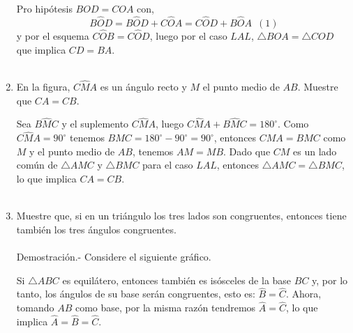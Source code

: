 \documentclass[10pt]{article}
\begin{document}
\begin{enumerate}
	Pro hipótesis $BOD=COA$ con, $$B\widehat{O}D = B\widehat{O}D + C\widehat{O}A = C\widehat{O}D + B\widehat{O}A \,\,\, (1)$$
	y por el esquema $C\widehat{O}B = C\widehat{O}D$, luego por el caso $LAL$, $\triangle BOA = \triangle COD$ que implica $CD = BA$.\\\\

	\item En la figura, $C\widehat{M}A$ es un ángulo recto y $M$ el punto medio de $AB$. Muestre que $CA=CB$.

	\begin{center}
	\end{center}

	Sea $B\widehat{M}C$ y el suplemento $C\widehat{M}A$, luego $C\widehat{M}A + B\widehat{M}C = 180^{\circ}$. Como $C\widehat{M}A = 90^{\circ}$ tenemos $B\widehat{M}C = 180^{\circ} - 90^{\circ} = 90^{\circ}$, entonces $CMA = BMC$ como $M$ y el punto medio de $AB$, tenemos $AM = MB$. Dado que $CM$ es un lado común de $\triangle AMC$ y $\triangle BMC$ para el caso $LAL$, entonces $\triangle AMC = \triangle BMC$, lo que implica $CA = CB$.\\\\
	
	\item Muestre que, si en un triángulo los tres lados son congruentes, entonces tiene también los tres ángulos congruentes.\\\\
	Demostración.-\; Considere el siguiente gráfico.

	\begin{center}
	\end{center}

	Si $\triangle ABC$ es equilátero, entonces también es isósceles de la base $BC$ y, por lo tanto, los ángulos de su base serán congruentes, esto es: $\widehat{B} = \widehat{C}$. Ahora, tomando $AB$ como base, por la misma razón tendremos $\widehat{A} = \widehat{C}$, lo que implica $\widehat{A} = \widehat{B} = \widehat{C}$.\\\\


\end{enumerate}
\end{document}

